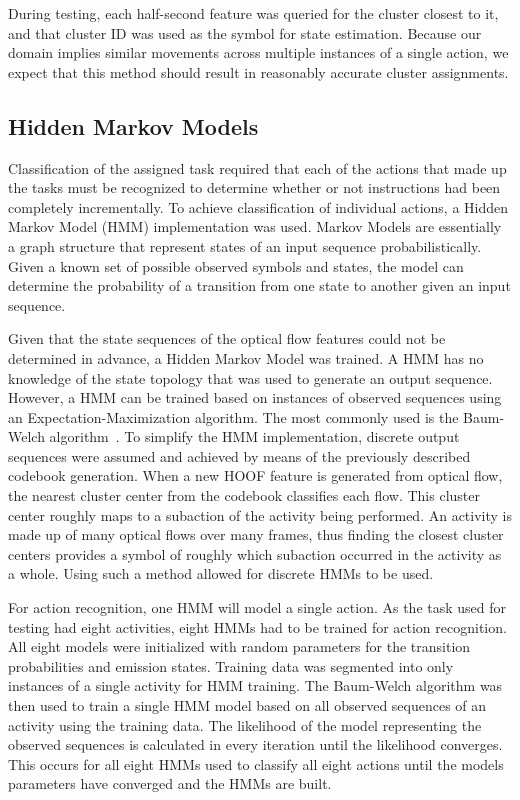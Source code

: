 \documentclass[10pt,twocolumn,letterpaper]{article}
\begin{document}
During testing, each half-second feature was queried for the cluster closest to it, and that cluster ID was used as the symbol for state estimation. Because our domain implies similar movements across multiple instances of a single action, we expect that this method should result in reasonably accurate cluster assignments.

\subsection{Hidden Markov Models}
Classification of the assigned task required that each of the actions that made up the tasks must be recognized to determine whether or not instructions had been completely incrementally. To achieve classification of individual actions, a Hidden Markov Model (HMM) implementation was used. Markov Models are essentially a graph structure that represent states of an input sequence probabilistically. Given a known set of possible observed symbols and states, the model can determine the probability of a transition from one state to another given an input sequence.

Given that the state sequences of the optical flow features could not be determined in advance, a Hidden Markov Model was trained. A HMM has no knowledge of the state topology that was used to generate an output sequence. However, a HMM can be trained based on instances of observed sequences using an Expectation-Maximization algorithm. The most commonly used is the Baum-Welch algorithm~\cite{welch2003hidden}. To simplify the HMM implementation, discrete output sequences were assumed and achieved by means of the previously described codebook generation. When a new HOOF feature is generated from optical flow, the nearest cluster center from the codebook classifies each flow. This cluster center roughly maps to a subaction of the activity being performed. An activity is made up of many optical flows over many frames, thus finding the closest cluster centers provides a symbol of roughly which subaction occurred in the activity as a whole. Using such a method allowed for discrete HMMs to be used.

For action recognition, one HMM will model a single action. As the task used for testing had eight activities, eight HMMs had to be trained for action recognition. All eight models were initialized with random parameters for the transition probabilities and emission states. Training data was segmented into only instances of a single activity for HMM training. The Baum-Welch algorithm was then used to train a single HMM model based on all observed sequences of an activity using the training data. The likelihood of the model representing the observed sequences is calculated in every iteration until the likelihood converges. This occurs for all eight HMMs used to classify all eight actions until the models parameters have converged and the HMMs are built.
\end{document}
